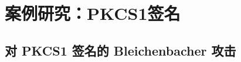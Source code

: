 \section{案例研究：PKCS1签名}\label{sec:13-6}

\subsection{对 PKCS1 签名的 Bleichenbacher 攻击}\label{subsec:13-6-1}